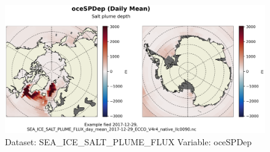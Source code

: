 \begin{figure}[H]
\centering
\includegraphics[scale=0.55]{../images/plots/native_plots/Sea-Ice_Salt_Plume_Fluxes/oceSPDep.png}
\caption{Dataset: SEA\_ICE\_SALT\_PLUME\_FLUX Variable: oceSPDep}
\label{tab:table-SEA_ICE_SALT_PLUME_FLUX_oceSPDep-Plot}
\end{figure}
\pagebreak
